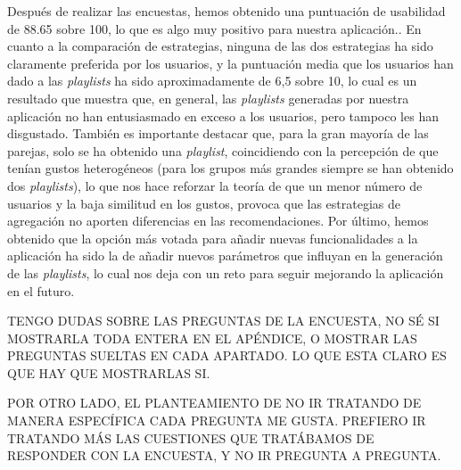 Después de realizar las encuestas, hemos obtenido una puntuación de usabilidad de 88.65 sobre 100, lo que es algo muy positivo para nuestra aplicación..
En cuanto a la comparación de estrategias, ninguna de las dos estrategias ha sido claramente preferida por los usuarios, y la puntuación media 
que los usuarios han dado a las \textit{playlists} ha sido aproximadamente de 6,5 sobre 10, lo cual es un resultado que muestra que, 
en general, las \textit{playlists} generadas por nuestra aplicación no han entusiasmado en exceso a los usuarios, pero tampoco les han disgustado.
También es importante destacar que, para la gran mayoría de las parejas, solo se ha obtenido una \textit{playlist}, coincidiendo con la percepción
de que tenían gustos heterogéneos (para los grupos más grandes siempre se han obtenido dos \textit{playlists}), lo que nos hace reforzar la teoría 
de que un menor número de usuarios y la baja similitud en los gustos, provoca que las estrategias de agregación no aporten diferencias en las recomendaciones.
Por último, hemos obtenido que la opción más votada para añadir nuevas funcionalidades a la aplicación ha sido la de añadir nuevos parámetros que influyan 
en la generación de las \textit{playlists}, lo cual nos deja con un reto para seguir mejorando la aplicación en el futuro.


TENGO DUDAS SOBRE LAS PREGUNTAS DE LA ENCUESTA, NO SÉ SI MOSTRARLA TODA ENTERA EN EL APÉNDICE, O MOSTRAR LAS PREGUNTAS SUELTAS EN CADA APARTADO.
LO QUE ESTA CLARO ES QUE HAY QUE MOSTRARLAS SI. 

POR OTRO LADO, EL PLANTEAMIENTO DE NO IR TRATANDO DE MANERA ESPECÍFICA CADA PREGUNTA ME GUSTA. PREFIERO IR
TRATANDO MÁS LAS CUESTIONES QUE TRATÁBAMOS DE RESPONDER CON LA ENCUESTA, Y NO IR PREGUNTA A PREGUNTA.